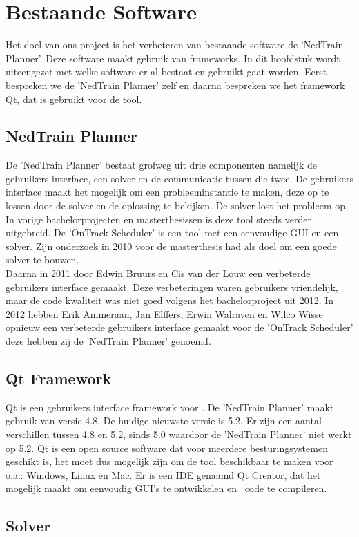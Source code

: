 \section{Bestaande Software}
Het doel van ons project is het verbeteren van bestaande software de 'NedTrain Planner'. Deze software maakt gebruik van frameworks. In dit hoofdstuk wordt uiteengezet met welke software er al bestaat en gebruikt gaat worden. Eerst bespreken we de 'NedTrain Planner' zelf en daarna bespreken we het framework Qt, dat is gebruikt voor de tool. 

\subsection{NedTrain Planner}
De 'NedTrain Planner' bestaat grofweg uit drie componenten namelijk de gebruikers interface, een solver en de communicatie tussen die twee. De gebruikers interface maakt het mogelijk om een probleeminstantie te maken, deze op te lossen door de solver en de oplossing te bekijken. De solver lost het probleem op. \\

In vorige bachelorprojecten en masterthesissen is deze tool steeds verder uitgebreid. De 'OnTrack Scheduler' is een tool met een eenvoudige GUI en een solver. Zijn onderzoek in 2010 voor de masterthesis had als doel om een goede solver te bouwen. \cite{ronaldevers2010} \\

Daarna in 2011 door Edwin Bruurs en Cis van der Louw een verbeterde gebruikers interface gemaakt.\cite{bep2011nedtrain} Deze verbeteringen waren gebruikers vriendelijk, maar de code kwaliteit was niet goed volgens het bachelorproject uit 2012.\cite{bep2012nedtrain} In 2012 hebben Erik Ammeraan, Jan Elffers, Erwin Walraven en Wilco Wisse opnieuw een verbeterde gebruikers interface gemaakt voor de 'OnTrack Scheduler' deze hebben zij de 'NedTrain Planner' genoemd.

\subsection{Qt Framework}
Qt is een gebruikers interface framework voor \cpp . De 'NedTrain Planner' maakt gebruik van versie 4.8. De huidige nieuwste versie is 5.2. Er zijn een aantal verschillen tussen 4.8 en 5.2, sinds 5.0 waardoor de 'NedTrain Planner' niet werkt op 5.2. Qt is een open source software dat voor meerdere besturingsystemen geschikt is, het moet dus mogelijk zijn om de tool beschikbaar te maken voor o.a.: Windows, Linux en Mac. Er is een IDE genaamd Qt Creator, dat het mogelijk maakt om eenvoudig GUI's te ontwikkelen en \cpp\ code te compileren. \cite{seminarium2014}

\subsection{Solver}


